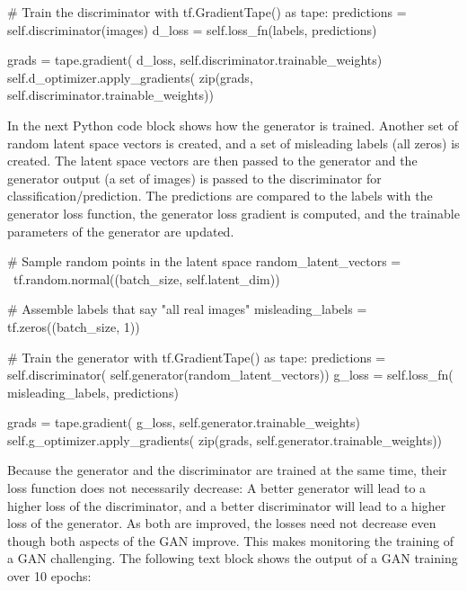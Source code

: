 \begin{withcode}
\begin{pythoncode}
        # Train the discriminator
        with tf.GradientTape() as tape:
            predictions = self.discriminator(images)
            d_loss = self.loss_fn(labels, predictions)
            
        grads = tape.gradient(
            d_loss, 
            self.discriminator.trainable_weights)
        self.d_optimizer.apply_gradients(
            zip(grads, self.discriminator.trainable_weights))
\end{pythoncode}

In the next Python code block shows how the generator is trained. Another set of random latent space vectors is created, and a set of misleading labels (all zeros) is created. The latent space vectors are then passed to the generator and the generator output (a set of images) is passed to the discriminator for classification/prediction. The predictions are compared to the labels with the generator loss function, the generator loss gradient is computed, and the trainable parameters of the generator are updated.

\begin{pythoncode}
        # Sample random points in the latent space
        random_latent_vectors = \
            tf.random.normal((batch_size, self.latent_dim))

        # Assemble labels that say "all real images"
        misleading_labels = tf.zeros((batch_size, 1))

        # Train the generator 
        with tf.GradientTape() as tape:
            predictions = self.discriminator(
                self.generator(random_latent_vectors))
            g_loss = self.loss_fn(
                misleading_labels, predictions)

        grads = tape.gradient(
            g_loss, 
            self.generator.trainable_weights)
        self.g_optimizer.apply_gradients(
            zip(grads, self.generator.trainable_weights))
\end{pythoncode}

Because the generator and the discriminator are trained at the same time, their loss function does not necessarily decrease: A better generator will lead to a higher loss of the discriminator, and a better discriminator will lead to a higher loss of the generator. As both are improved, the losses need not decrease even though both aspects of the GAN improve. This makes monitoring the training of a GAN challenging. The following text block shows the output of a GAN training over 10 epochs:


\end{withcode}
